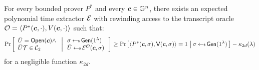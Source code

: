 \begin{lemma}[Soundness]\label{lem:proximity2d_sound}
For every bounded prover $P^\ast$ and every $\bm{c}\in \mathbb{G}^n$, there exists an
expected polynomial time extractor $\mathcal{E}$ with
rewinding access to the transcript oracle $\mathcal{O}=\langle P^\ast(\bm{c},\cdot),V(\bm{c},\cdot)\rangle$
such that:
\begin{align*}
\condprob{
\begin{array}{l}
\bar{U} = \open(\bm{c}) \wedge \\
\bar{U}\mc{T}\in \mc{C}_2
\end{array}
}{
\begin{array}{l}
\sigma\sample \gen(\secparam) \\
\bar{U}\sample \extr^{\mc{O}}(\bm{c},\sigma)
\end{array}}
\geq 
\condprob{\langle P^\ast(\bm{c},\sigma),\verifier(\bm{c},\sigma)\rangle =
1}{\sigma\sample \gen(\secparam)} - \kappa_{2d}(\secpar)
\end{align*}
for a negligible function $\kappa_{2d}$.
\end{lemma}
